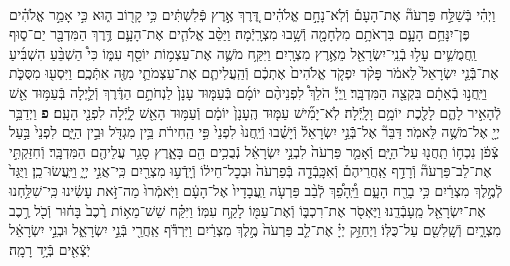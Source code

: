 \documentclass[twoside, openany, parskip=half, 11pt]{book}
\begin{document}
\begin{footnotesize}
\begin{multicols}{2}
\\
וַיְהִ֗י בְּֿשַׁלַּ֣ח פַּרְעֹה֘ אֶת־הָעָם֒ וְֿלֹֽא־נָחָ֣ם אֱלֹהִ֗ים דֶּ֚רֶךְ אֶ֣רֶץ פְּֿלִשְׁתִּ֔ים כִּ֥י קָר֖וֹב ה֑וּא כִּ֣י אָמַ֣ר אֱלֹהִ֗ים פֶּן־יִנָּחֵ֥ם הָעָ֛ם בִּרְאֹתָ֥ם מִלְחָמָ֖ה וְֿשָׁ֥בוּ מִצְרָֽיְֿמָה׃ וַיַּסֵּ֨ב אֱלֹהִ֧ים אֶת־הָעָ֛ם דֶּ֥רֶךְ הַמִּדְבָּ֖ר יַם־ס֑וּף וַֽחֲמֻשִׁ֛ים עָל֥וּ בְֿנֵֽי־יִשְׂרָאֵ֖ל מֵאֶ֥רֶץ מִצְרָֽיִם׃ וַיִּקַּ֥ח מֹשֶׁ֛ה אֶת־עַצְמ֥וֹת יוֹסֵ֖ף עִמּ֑וֹ כִּי֩ הַשְׁבֵּ֨עַ הִשְׁבִּ֜יעַ אֶת־בְּֿֿנֵ֤י יִשְׂרָאֵל֙ לֵאמֹ֔ר פָּקֹ֨ד יִפְקֹ֤ד אֱלֹהִים֙ אֶתְכֶ֔ם וְֿהַֽעֲלִיתֶ֧ם אֶת־עַצְמֹתַ֛י מִזֶּ֖ה אִתְּֿכֶֽם׃
וַיִּסְע֖וּ מִסֻּכֹּ֑ת וַיַּֽחֲנ֣וּ בְֿאֵתָ֔ם בִּקְצֵ֖ה הַמִּדְבָּֽר׃ וַֽיְיָ֡ הֹלֵךְ֩ לִפְנֵיהֶ֨ם יוֹמָ֜ם בְּֿעַמּ֤וּד עָנָן֙ לַנְחֹתָ֣ם הַדֶּ֔רֶךְ וְֿלַ֛יְלָה בְּֿעַמּ֥וּד אֵ֖שׁ לְֿהָאִ֣יר לָהֶ֑ם לָלֶ֖כֶת יוֹמָ֥ם וָלָֽיְֿלָה׃ לֹֽא־יָמִ֞ישׁ עַמּ֤וּד הֶֽעָנָן֙ יוֹמָ֔ם וְֿעַמּ֥וּד הָאֵ֖שׁ לָ֑יְֿלָה לִפְנֵ֖י הָעָֽם׃ \textbf{פ}
וַיְדַבֵּ֥ר יְיָ֖ אֶל־מֹשֶׁ֥ה לֵּאמֹֽר׃ דַּבֵּר֘ אֶל־בְּֿֿנֵ֣י יִשְׂרָאֵל֒ וְֿיָשֻׁ֗בוּ וְֿיַֽחֲנוּ֙ לִפְנֵי֙ פִּ֣י הַֽחִירֹ֔ת בֵּ֥ין מִגְדֹּ֖ל וּבֵ֣ין הַיָּ֑ם לִפְנֵי֙ בַּ֣עַל צְֿפֹ֔ן נִכְח֥וֹ תַֽחֲנ֖וּ עַל־הַיָּֽם׃ וְֿאָמַ֤ר פַּרְעֹה֙ לִבְנֵ֣י יִשְׂרָאֵ֔ל נְֿבֻכִ֥ים הֵ֖ם בָּאָ֑רֶץ סָגַ֥ר עֲלֵיהֶ֖ם הַמִּדְבָּֽר׃ וְֿחִזַּקְתִּ֣י אֶת־לֵב־פַּרְעֹה֘ וְֿרָדַ֣ף אַֽחֲרֵיהֶם֒ וְֿאִכָּֽבְֿדָ֤ה בְּֿפַרְעֹה֙ וּבְכׇל־חֵיל֔וֹ וְֿיָֽדְֿע֥וּ מִצְרַ֖יִם כִּֽי־אֲנִ֣י יְיָ֑ וַיַּֽעֲשׂוּ־כֵֽן׃
וַיֻּגַּד֙ לְֿמֶ֣לֶךְ מִצְרַ֔יִם כִּ֥י בָרַ֖ח הָעָ֑ם וַיֵּֽ֠הָפֵ֠ךְ לְֿבַ֨ב פַּרְעֹ֤ה וַֽעֲבָדָיו֙ אֶל־הָעָ֔ם וַיֹּֽאמְֿרוּ֙ מַה־זֹּ֣את עָשִׂ֔ינוּ כִּֽי־שִׁלַּ֥חְנוּ אֶת־יִשְׂרָאֵ֖ל מֵֽעָבְֿדֵֽנוּ׃ וַיֶּאְסֹ֖ר אֶת־רִכְבּ֑וֹ וְֿאֶת־עַמּ֖וֹ לָקַ֥ח עִמּֽוֹ׃ וַיִּקַּ֗ח שֵׁשׁ־מֵא֥וֹת רֶ֨כֶב֙ בָּח֔וּר וְֿכֹ֖ל רֶ֣כֶב מִצְרָ֑יִם וְֿשָֽׁלִשִׁ֖ם עַל־כֻּלּֽוֹ׃ וַיְחַזֵּ֣ק יְיָ֗ אֶת־לֵ֤ב פַּרְעֹה֙ מֶ֣לֶךְ מִצְרַ֔יִם וַיִּרְדֹּ֕ף אַֽחֲרֵ֖י בְּֿנֵ֣י יִשְׂרָאֵ֑ל וּבְנֵ֣י יִשְׂרָאֵ֔ל יֹֽצְֿאִ֖ים בְּֿיָ֥ד רָמָֽה׃


\end{multicols}
\end{footnotesize}
\end{document}
